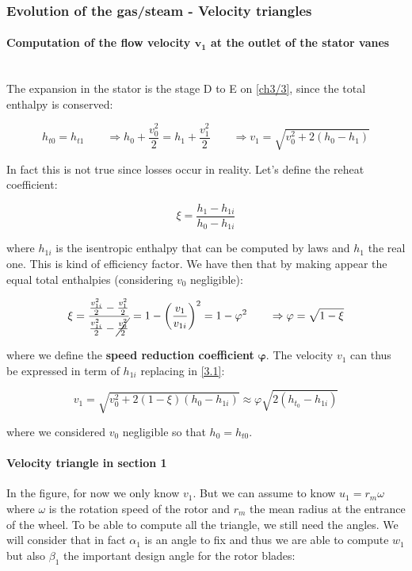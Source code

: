 \subsubsection{Evolution of the gas/steam - Velocity triangles}
\paragraph{Computation of the flow velocity $\bm{v_1}$ at the outlet of the stator vanes}\ \\
The expansion in the stator is the stage D to E on \autoref{ch3/3}, since the total enthalpy is conserved: 

\begin{equation}
h_{t0} = h_{t1} \qquad \Rightarrow h_0 + \frac{v_0^2}{2} = h_1 + \frac{v_{1}^2}{2}\qquad \Rightarrow v_1 = \sqrt{v_0^2 + 2(h_0- h_1)}
\label{3.1}
\end{equation}

In fact this is not true since losses occur in reality. Let's define the reheat coefficient:

\begin{equation}
\xi = \frac{h_1 - h_{1i}}{h_0 - h_{1i}}
\end{equation}

where $h_{1i}$ is the isentropic enthalpy that can be computed by laws and $h_1$ the real one. This is kind of efficiency factor. We have then that by making appear the equal total enthalpies (considering $v_0$ negligible):

\begin{equation}
\xi = \frac{\frac{v_{1i}^2}{2} - \frac{v_{1}^2}{2}}{\frac{v_{1i}^2}{2} - \cancel{\frac{v_{0}^2}{2}}} = 1-\left( \frac{v_1}{v_{1i}} \right)^2 = 1 - \varphi ^2 \qquad \Rightarrow \varphi = \sqrt{1 - \xi} 
\end{equation}

where we define the \textbf{speed reduction coefficient} $\bm{\varphi}$. The velocity $v_1$ can thus be expressed in term of $h_{1i}$ replacing in \eqref{3.1}:  

\begin{equation}
v_1 = \sqrt{v_0^2 + 2 (1-\xi)(h_0 - h_{1i})} \approx \varphi \sqrt{2(h_{t_0} - h_{1i})}
\end{equation}

where we considered $v_0$ negligible so that $h_0 = h_{t0}$.

\paragraph{Velocity triangle in section 1}
In the figure, for now we only know $v_1$. But we can assume to know $u_1 = r_m \omega$ where $\omega$ is the rotation speed of the rotor and $r_m$ the mean radius at the entrance of the wheel. To be able to compute all the triangle, we still need the angles. We will consider that in fact $\alpha _1$ is an angle to fix and thus we are able to compute $w_1$ but also $\beta _1$ the important design angle for the rotor blades: 

